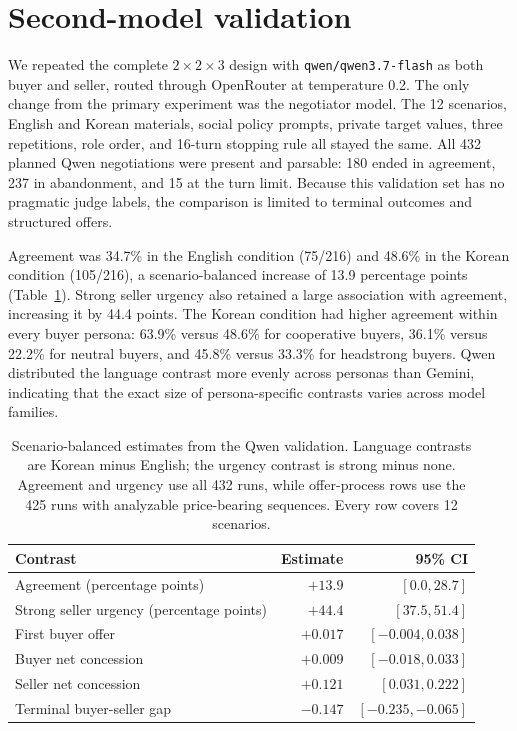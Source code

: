 \documentclass{article}
\begin{document}
\FloatBarrier

\section{Second-model validation}
\label{app:qwen-validation}


We repeated the complete $2\times2\times3$ design with
\texttt{qwen/qwen3.7-flash} as both buyer and seller, routed through OpenRouter
at temperature 0.2. 
The only change from the primary experiment was the negotiator model. The 12 scenarios, English and Korean materials, social policy prompts, private target values, three repetitions, role order, and 16-turn stopping rule all stayed the same.
All 432 planned Qwen negotiations were
present and parsable: 180 ended in agreement, 237 in abandonment, and 15 at
the turn limit. 
Because this validation set has no pragmatic judge labels, the
comparison is limited to terminal outcomes and structured offers.

Agreement was 34.7\% in the English condition (75/216) and 48.6\% in the
Korean condition (105/216), a scenario-balanced increase of 13.9 percentage
points (Table~\ref{tab:qwen-validation}). Strong seller urgency also retained
a large association with agreement, increasing it by 44.4 points. The Korean
condition had higher agreement within every buyer persona: 63.9\% versus
48.6\% for cooperative buyers, 36.1\% versus 22.2\% for neutral buyers, and
45.8\% versus 33.3\% for headstrong buyers. Qwen distributed the language
contrast more evenly across personas than Gemini, indicating that the exact
size of persona-specific contrasts varies across model families.

\begin{table}[ht]
\caption{Scenario-balanced estimates from the Qwen validation. Language
contrasts are Korean minus English; the urgency contrast is strong minus none.
Agreement and urgency use all 432 runs, while offer-process rows use the 425
runs with analyzable price-bearing sequences. Every row covers 12 scenarios.}
\label{tab:qwen-validation}
\centering
\small
\begin{tabular}{lrr}
\toprule
Contrast & Estimate & 95\% CI \\
\midrule
Agreement (percentage points) & $+13.9$ & $[0.0,28.7]$ \\
Strong seller urgency (percentage points) & $+44.4$ & $[37.5,51.4]$ \\
First buyer offer & $+0.017$ & $[-0.004,0.038]$ \\
Buyer net concession & $+0.009$ & $[-0.018,0.033]$ \\
Seller net concession & $+0.121$ & $[0.031,0.222]$ \\
Terminal buyer-seller gap & $-0.147$ & $[-0.235,-0.065]$ \\
\bottomrule
\end{tabular}
\end{table}
\end{document}
